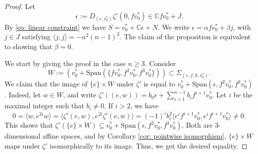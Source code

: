 \documentclass[10pt,a4paper]{amsart}
\newcommand{\CC}{\mathbb{C}}
\begin{document}
\begin{proof}
    Let $$\epsilon := D_{(e,v_0^*)}\zeta'(0, fv_0^*)\in \CC fv_0^* + J.$$ By \eqref{eq: linear constraint} we have $S = v_0^* + \CC \epsilon + N$. We write $\epsilon = \alpha fv_0^* + \beta j$, with $j\in J$ satisfying $\langle j, j\rangle = -n^2(n-1)^2$.
    The claim of the proposition is equivalent to showing that $\beta=0$.
    
    We start by giving the proof in the case $n\geq 3$.
    Consider $$W:=\left(v_0^*+\mathrm{Span}(\{fv_0^*, f^2v_0^*, f^3v_0^*\})\right)\subset \Sigma_{(e, f, h, v_0^*)}.$$
    We claim that the image of $\{e\}\times W$ under $\zeta'$ is equal to $v_0^* + \mathrm{Span}(\epsilon, f^2v_0^*, f^3v_0^*)$.
    Indeed, let $w\in W$, and write $\zeta'((e, w))=b_0\epsilon + \sum_{i=1}^{n-1}b_i f^{i+1}v_0^*$. Let $i$ be the maximal integer such that $b_i\neq 0$.
    If $i > 2$, we have
    $$0 = \langle w, e^{2i} w\rangle = \langle \zeta'(e, w), e^{2i} \zeta'(e, w)\rangle = (-1)^i b_i^2 \langle e^if^{i+1}v_0^*, e^if^{i+1}v_0^*\rangle \neq 0.$$
    This shows that $\zeta'(\{e\}\times W)\subseteq v_0^* + \mathrm{Span}(\epsilon, f^2v_0^*, f^3v_0^*)$. Both are 3-dimensional affine spaces, and by Corollary \ref{cor: pointwise isomorphism}, $\{e\}\times W$ maps under $\zeta'$ isomorphically to its image. Thus, we get the desired equality.


\end{proof}
\end{document}
